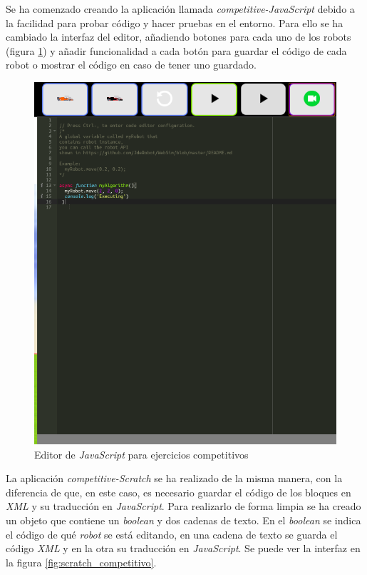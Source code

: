 Se ha comenzado creando la aplicación llamada \textit{competitive-JavaScript} debido a la facilidad para probar código y hacer pruebas en el entorno. Para ello se ha cambiado la interfaz del editor, añadiendo botones para cada uno de los robots (figura \ref{fig:javascript_competitivo}) y añadir funcionalidad a cada botón para guardar el código de cada robot o mostrar el código en caso de tener uno guardado.
    \begin{figure}[H]
        \centering            \includegraphics[scale=0.30]{img/competitiveEditorJavascript.png}
        \caption{Editor de \textit{JavaScript} para ejercicios competitivos}
        \label{fig:javascript_competitivo}
    \end{figure}

La aplicación \textit{competitive-Scratch} se ha realizado de la misma manera, con la diferencia de que, en este caso, es necesario guardar el código de los bloques en \textit{XML} y su traducción en \textit{JavaScript}. Para realizarlo de forma limpia se ha creado un objeto que contiene un \textit{boolean} y dos cadenas de texto. En el \textit{boolean} se indica el código de qué \textit{robot} se está editando, en una cadena de texto se guarda el código \textit{XML} y en la otra su traducción en \textit{JavaScript}. Se puede ver la interfaz en la figura \ref{fig:scratch_competitivo}.


